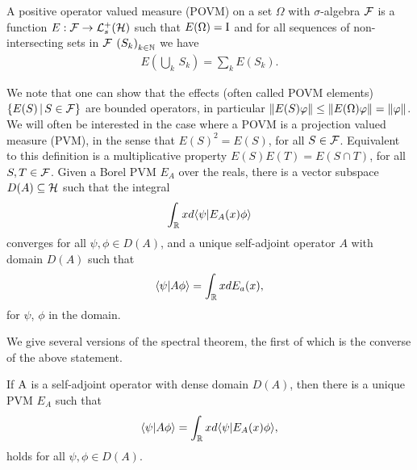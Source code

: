 \begin{defn}\label{defn:povm}
  A positive operator valued measure (POVM) on a set $\Omega$ with $\sigma$-algebra $\mathcal{F}$ is a function $E:\fcal\to\posops[\hcal]$ such that $E(\Omega) = \operatorname{I}$ and for all sequences of non-intersecting sets in $\mathcal{F}$ $\seq{S_k}[k\in\N]$ we have 
  \begin{align}
    E\left(\bigcup_k \,S_k\right) = \sum_k E(S_k).
  \end{align}
\end{defn}
We note that one can show that the effects (often called POVM elements) $\left\{E(S)\,\middle|\,S\in\mathcal{F}\right\}$ are bounded operators, in particular ${\left\lVert{E(S)\varphi}\right\rVert} \leq {\left\lVert{E(\Omega)\varphi}\right\rVert} = {\left\lVert{\varphi}\right\rVert}$. We will often be interested in the case where a POVM is a projection valued measure (PVM), in the sense that $E(S)^2 = E(S)$, for all $S\in\mathcal{F}$. Equivalent to this definition is a multiplicative property $E(S)E(T) = E(S\cap T)$, for all $S,T\in\mathcal{F}$. Given a Borel PVM $E_A$ over the reals, there is a vector subspace $D(A)\subseteq\mathcal{H}$ such that the integral
\begin{align}
  \int_{\mathbb{R}} x d\langle \psi|E_A(x)\phi\rangle 
\end{align}
converges for all $\psi,\phi\in D(A)$, and a unique self-adjoint operator $A$ with domain $D(A)$ such that 
\begin{align}
  \langle \psi|A\phi\rangle = \int_{\mathbb{R}} x dE_a(x),
\end{align}
for $\psi$, $\phi$ in the domain.

We give several versions of the spectral theorem, the first of which is the converse of the above statement.

\begin{thm}
  If $\operatorname{A}$ is a self-adjoint operator with dense domain $D(A)$, then there is a unique PVM $E_A$ such that
  \begin{align}
    \langle \psi|A\phi\rangle = \int_{\mathbb{R}} x d\langle \psi|E_A(x)\phi\rangle,
  \end{align}
  holds for all $\psi,\phi\in D(A)$.
\end{thm}

